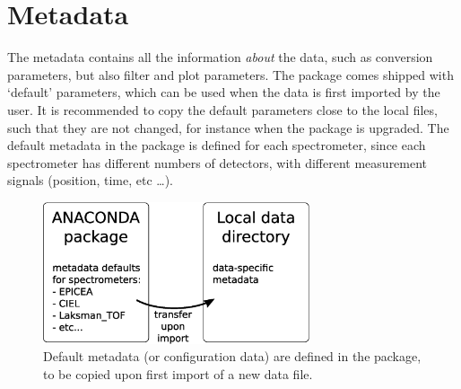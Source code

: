 \section{Metadata}
The metadata contains all the information \emph{about} the data, such as conversion parameters, but also filter and plot parameters. The package comes shipped with `default' parameters, which can be used when the data is first imported by the user. It is recommended to copy the default parameters close to the local files, such that they are not changed, for instance when the package is upgraded.
The default metadata in the package is defined for each spectrometer, since each spectrometer has different numbers of detectors, with different measurement signals (position, time, etc \dots). 

\begin{figure}[H]
   \centering
    \centerline{\includegraphics[width=0.7\textwidth]{Graphics/metadata_defaults.eps}}
\caption{Default metadata (or configuration data) are defined in the package, to be copied upon first import of a new data file.}
\label{metadata_defaults}
\end{figure}

